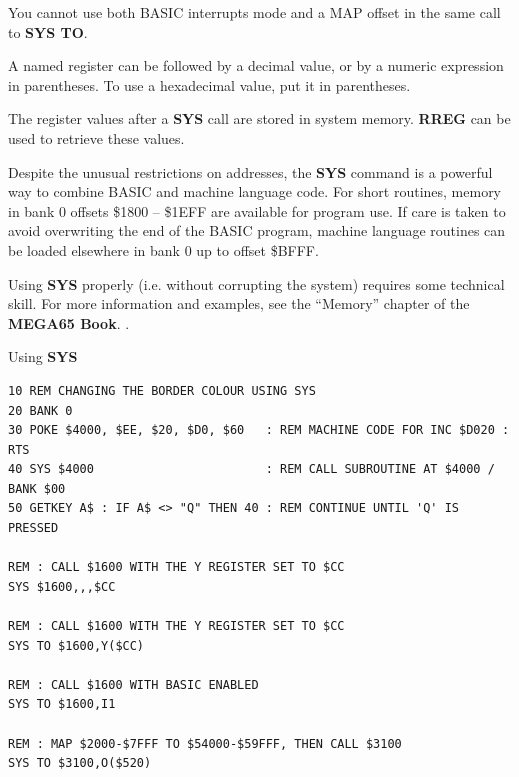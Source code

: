 \begin{description}[leftmargin=2cm,style=nextline]
                  You cannot use both BASIC interrupts mode and a MAP offset in the same call to {\bf SYS TO}.

                  A named register can be followed by a decimal value, or by a numeric expression in parentheses. To use a hexadecimal value, put it in parentheses.

\item [Remarks:]  The register values after a {\bf SYS} call are stored in system memory. {\bf RREG} can be used to retrieve these values.

                  Despite the unusual restrictions on addresses, the {\bf SYS} command is a powerful way to combine BASIC and machine language code. For short routines, memory in bank 0 offsets \$1800 -- \$1EFF are available for program use. If care is taken to avoid overwriting the end of the BASIC program, machine language routines can be loaded elsewhere in bank 0 up to offset \$BFFF.

                  Using {\bf SYS} properly (i.e. without corrupting the system) requires some technical skill. For more information and examples, see \ifdefined\printmanual
                     the ``Memory'' chapter of the {\bf MEGA65 Book}.
                  \else
                     .
                  \fi

\item [Example:]  Using {\bf SYS}

\begin{tcolorbox}[colback=black,coltext=white]
\verbatimfont{\codefont}
\begin{verbatim}
10 REM CHANGING THE BORDER COLOUR USING SYS
20 BANK 0
30 POKE $4000, $EE, $20, $D0, $60   : REM MACHINE CODE FOR INC $D020 : RTS
40 SYS $4000                        : REM CALL SUBROUTINE AT $4000 / BANK $00
50 GETKEY A$ : IF A$ <> "Q" THEN 40 : REM CONTINUE UNTIL 'Q' IS PRESSED

REM : CALL $1600 WITH THE Y REGISTER SET TO $CC
SYS $1600,,,$CC

REM : CALL $1600 WITH THE Y REGISTER SET TO $CC
SYS TO $1600,Y($CC)

REM : CALL $1600 WITH BASIC ENABLED
SYS TO $1600,I1

REM : MAP $2000-$7FFF TO $54000-$59FFF, THEN CALL $3100
SYS TO $3100,O($520)
\end{verbatim}
\end{tcolorbox}
\end{description}



